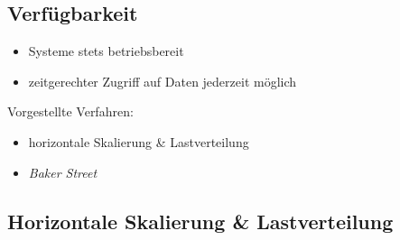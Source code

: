 \documentclass{beamer}
\begin{document}
\subsection{Verfügbarkeit}
\begin{frame}{\insertsubsection}
	\begin{itemize}
		\setlength\itemsep{1em}
		\item Systeme stets betriebsbereit
		\item zeitgerechter Zugriff auf Daten jederzeit möglich
	\end{itemize}
	\vspace*{1cm}
	\pause
	Vorgestellte Verfahren:
	\begin{itemize}
		\item horizontale Skalierung \& Lastverteilung
		\item \textit{Baker Street}
	\end{itemize}
\end{frame}


\subsection{Horizontale Skalierung \& Lastverteilung}
\end{document}

